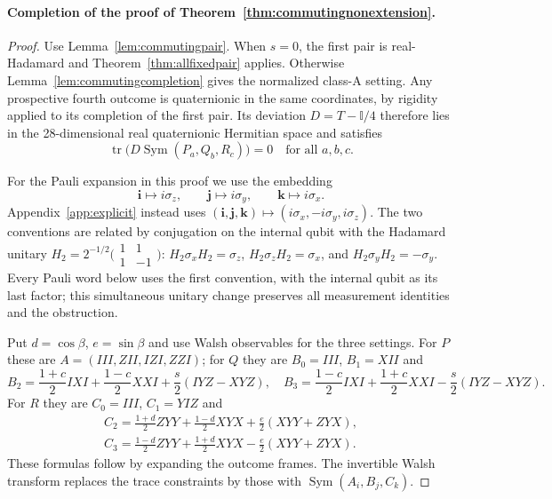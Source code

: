 \documentclass[11pt]{article}
\newcommand{\id}{\mathbb I}
\newcommand{\Sym}{\operatorname{Sym}}
\begin{document}
\paragraph{Completion of the proof of Theorem~\ref{thm:commutingnonextension}.}
\begin{proof}
Use Lemma~\ref{lem:commutingpair}. When $s=0$, the first pair is
real-Hadamard and Theorem~\ref{thm:allfixedpair} applies.
Otherwise Lemma~\ref{lem:commutingcompletion} gives the normalized class-A
setting. Any prospective fourth outcome is quaternionic in the same
coordinates, by rigidity applied to its completion of the first pair.
Its deviation $D=T-\id/4$ therefore lies in the 28-dimensional real
quaternionic Hermitian space and satisfies
\[
 \operatorname{tr}\bigl(D\Sym(P_a,Q_b,R_c)\bigr)=0
 \quad\text{for all }a,b,c.
\]

For the Pauli expansion in this proof we use the embedding
\[
 \mathbf i\longmapsto i\sigma_z,\qquad
 \mathbf j\longmapsto i\sigma_y,\qquad
 \mathbf k\longmapsto i\sigma_x.
\]
Appendix~\ref{app:explicit} instead uses
$(\mathbf i,\mathbf j,\mathbf k)\mapsto
(i\sigma_x,-i\sigma_y,i\sigma_z)$.
The two conventions are related by conjugation on the internal qubit
with the Hadamard unitary
$H_2=2^{-1/2}\bigl(\begin{smallmatrix}1&1\\1&-1\end{smallmatrix}\bigr)$:
$H_2\sigma_xH_2=\sigma_z$, $H_2\sigma_zH_2=\sigma_x$, and
$H_2\sigma_yH_2=-\sigma_y$.
Every Pauli word below uses the first convention, with the internal
qubit as its last factor; this simultaneous unitary change preserves
all measurement identities and the obstruction.

Put $d=\cos\beta$, $e=\sin\beta$ and use Walsh observables
for the three settings. For $P$ these are
$A=(III,ZII,IZI,ZZI)$; for $Q$ they are $B_0=III$, $B_1=XII$ and
\[
 B_2=\frac{1+c}{2}IXI+\frac{1-c}{2}XXI
       +\frac{s}{2}(IYZ-XYZ),\quad
 B_3=\frac{1-c}{2}IXI+\frac{1+c}{2}XXI
       -\frac{s}{2}(IYZ-XYZ).
\]
For $R$ they are $C_0=III$, $C_1=YIZ$ and
\[
\begin{gathered}
 C_2=\frac{1+d}{2}ZYY+\frac{1-d}{2}XYX
       +\frac e2(XYY+ZYX),\\
 C_3=\frac{1-d}{2}ZYY+\frac{1+d}{2}XYX
       -\frac e2(XYY+ZYX).
\end{gathered}
\]
These formulas follow by expanding the outcome frames.
The invertible Walsh transform replaces the trace constraints by those
with $\Sym(A_i,B_j,C_k)$.


\end{proof}
\end{document}

